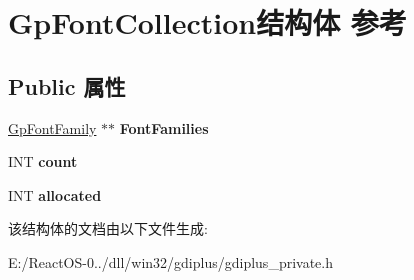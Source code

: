 \hypertarget{struct_gp_font_collection}{}\section{Gp\+Font\+Collection结构体 参考}
\label{struct_gp_font_collection}
\subsection*{Public 属性}
\begin{DoxyCompactItemize}
\item 
\mbox{\label{struct_gp_font_collection_a73c9ef63284a82362a428740adb3c2b7}} 
\hyperlink{struct_gp_font_family}{Gp\+Font\+Family} $\ast$$\ast$ {\bfseries Font\+Families}
\item 
\mbox{\label{struct_gp_font_collection_a43301d880e8802e4a0baf044883fafdb}} 
I\+NT {\bfseries count}
\item 
\mbox{\label{struct_gp_font_collection_a01ba44e40cc0bbf18e1364fe6bdbe808}} 
I\+NT {\bfseries allocated}
\end{DoxyCompactItemize}


该结构体的文档由以下文件生成\+:\begin{DoxyCompactItemize}
\item 
E\+:/\+React\+O\+S-\/0../dll/win32/gdiplus/gdiplus\+\_\+private.\+h\end{DoxyCompactItemize}
